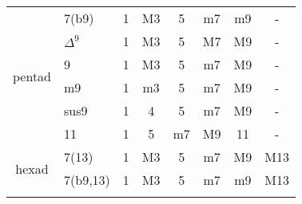 \begin{table*}[!h]
\begin{tabular}{clcccccc}
		\hline
		\multirow{6}{*}{pentad}& 7(b9)      & 1 & M3  & 5 & m7  & m9  & -\\
	                           & $\Delta^9$ & 1 & M3  & 5 & M7  & M9  & -\\
		                       & 9          & 1 & M3  & 5 & m7  & M9  & -\\
		                       & m9         & 1 & m3  & 5 & m7  & M9  & -\\
		                       & sus9       & 1 & 4   & 5 & m7  & M9  & -\\
		                       & 11         & 1 & 5   & m7& M9  & 11  & -\\ %
		\hline
		\multirow{2}{*}{hexad} & 7(13)      & 1 & M3  & 5 & m7  & M9  & M13\\ %
		                       & 7(b9,13)   & 1 & M3  & 5 & m7  & m9  & M13\\
		\hline \vspace{-0.2cm}
	\end{tabular}
	\label{tab: }
\end{table*}
